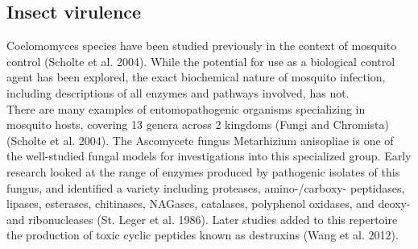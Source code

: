 \subsection{Insect virulence}
Coelomomyces species have been studied previously in the context of mosquito control (Scholte et al. 2004). While the potential for use as a biological control agent has been explored, the exact biochemical nature of mosquito infection, including descriptions of all enzymes and pathways involved, has not. \\
\indent There are many examples of entomopathogenic organisms specializing in mosquito hosts, covering 13 genera across 2 kingdoms (Fungi and Chromista) (Scholte et al. 2004). The Ascomycete fungus Metarhizium anisopliae is one of the well-studied fungal models for investigations into this specialized group. Early research looked at the range of enzymes produced by pathogenic isolates of this fungus, and identified a variety including proteases, amino-/carboxy- peptidases, lipases, esterases, chitinases, NAGases, catalases, polyphenol oxidases, and deoxy- and ribonucleases (St. Leger et al. 1986). Later studies added to this repertoire the production of toxic cyclic peptides known as destruxins (Wang et al. 2012). \\ 
